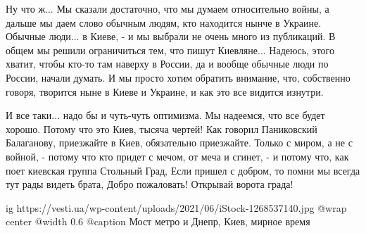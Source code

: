 Ну что ж... Мы сказали достаточно, что мы думаем относительно войны, а дальше
мы даем слово обычным людям, кто находится нынче в Украине. Обычные люди... в
Киеве, - и мы выбрали не очень много из публикаций. В общем мы решили
ограничиться тем, что пишут Киевляне... Надеюсь, этого хватит, чтобы кто-то там
наверху в России, да и вообще обычные люди по России, начали думать. И мы
просто хотим обратить внимание, что, собственно говоря, творится ныне в Киеве и
Украине, и как это все видится изнутри. 

И все таки... надо бы и чуть-чуть оптимизма. Мы надеемся, что все будет хорошо.
Потому что это Киев, тысяча чертей!  Как говорил Паниковский Балаганову,
приезжайте в Киев, обязательно приезжайте.  Только с миром, а не с войной, -
потому что кто придет с мечом, от меча и сгинет, - и потому что, как поет
киевская группа Стольный Град, Если пришел с добром, то помни мы всегда тут рады видеть
брата, Добро пожаловать! Открывай ворота града!

\ifcmt
  ig https://vesti.ua/wp-content/uploads/2021/06/iStock-1268537140.jpg
	@wrap center
	@width 0.6
	@caption Мост метро и Днепр, Киев, мирное время
\fi
